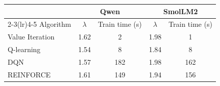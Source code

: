 \begin{tabular}{@{}lcccc@{}}
\toprule
 & \multicolumn{2}{c}{Qwen} & \multicolumn{2}{c}{SmolLM2} \\
\cmidrule(lr){2-3}\cmidrule(lr){4-5}
Algorithm & $\lambda$ & Train time (s) & $\lambda$ & Train time (s) \\
\midrule
Value Iteration & 1.62 & 2 & 1.98 & 1 \\
Q-learning & 1.54 & 8 & 1.84 & 8 \\
DQN & 1.57 & 182 & 1.98 & 162 \\
REINFORCE & 1.61 & 149 & 1.94 & 156 \\
\bottomrule
\end{tabular}